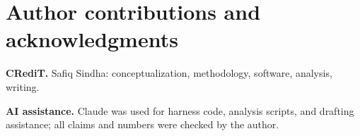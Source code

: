 \documentclass[10pt]{article}
\begin{document}


\section*{Author contributions and acknowledgments}
\textbf{CRediT.} Safiq Sindha: conceptualization, methodology, software,
analysis, writing.

\textbf{AI assistance.} Claude was used for harness code, analysis scripts,
and drafting assistance; all claims and numbers were checked by the author.

\appendix





\end{document}
